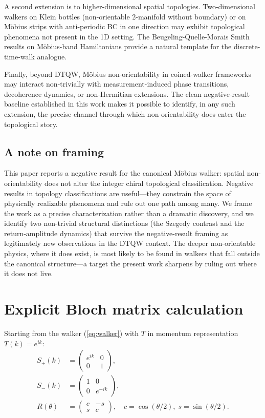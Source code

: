 \documentclass[aps,pra,reprint,amsmath,amssymb,superscriptaddress,nofootinbib,longbibliography]{revtex4-2}
\begin{document}
A second extension is to higher-dimensional spatial topologies. Two-dimensional walkers on Klein bottles (non-orientable 2-manifold without boundary) or on M\"obius strips with anti-periodic BC in one direction may exhibit topological phenomena not present in the 1D setting. The Beugeling-Quelle-Morais Smith results on M\"obius-band Hamiltonians provide a natural template for the discrete-time-walk analogue.

Finally, beyond DTQW, M\"obius non-orientability in coined-walker frameworks may interact non-trivially with measurement-induced phase transitions, decoherence dynamics, or non-Hermitian extensions. The clean negative-result baseline established in this work makes it possible to identify, in any such extension, the precise channel through which non-orientability does enter the topological story.

\subsection{A note on framing}

This paper reports a negative result for the canonical M\"obius walker: spatial non-orientability does not alter the integer chiral topological classification. Negative results in topology classifications are useful---they constrain the space of physically realizable phenomena and rule out one path among many. We frame the work as a precise characterization rather than a dramatic discovery, and we identify two non-trivial structural distinctions (the Szegedy contrast and the return-amplitude dynamics) that survive the negative-result framing as legitimately new observations in the DTQW context. The deeper non-orientable physics, where it does exist, is most likely to be found in walkers that fall outside the canonical structure---a target the present work sharpens by ruling out where it does not live.


\appendix

\section{Explicit Bloch matrix calculation}
\label{app:bloch}

Starting from the walker (\ref{eq:walker}) with $T$ in momentum representation $T(k) = e^{ik}$:
\begin{align}
S_+(k) &= \begin{pmatrix} e^{ik} & 0 \\ 0 & 1 \end{pmatrix}, \\
S_-(k) &= \begin{pmatrix} 1 & 0 \\ 0 & e^{-ik} \end{pmatrix}, \\
R(\theta) &= \begin{pmatrix} c & -s \\ s & c \end{pmatrix}, \quad c = \cos(\theta/2),\; s = \sin(\theta/2).
\end{align}
\end{document}
